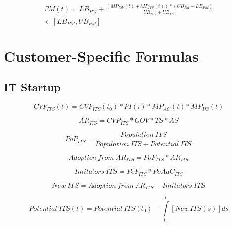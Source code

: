 \begin{eqnarray}
	PM(t) = LB_{PM} + \frac{(MP_{ISV}(t) + MP_{ITS}(t)) * (UB_{PM} - LB_{PM})}{UB_{ISV} + UB_{ITS}} \nonumber \\ \in [LB_{PM},UB_{PM}]
\end{eqnarray}

\section{Customer-Specific Formulas}\label{ch:app04:csf}


\subsection{IT Startup}\label{ch:app04:csf:its}

\begin{equation}
		CVP_{ITS}(t) =  CVP_{ITS}(t_0) * PI(t) * MP_{AC}(t) * MP_{PC}(t)
\end{equation}

\begin{equation}
		AR_{ITS} = CVP_{ITS} * GOV * TS * AS		
\end{equation}

\begin{equation}
	PoP_{ITS} = \frac{\mathit{Population~ITS}}{\mathit{Population~ITS}+\mathit{Potential~ITS}}
\end{equation}

\begin{equation}
	\mathit{Adoption~from~AR_{ITS}} = PoP_{ITS} * AR_{ITS}
\end{equation}

\begin{equation}
	\mathit{Imitators~ITS} = PoP_{ITS} * PoAaC_{ITS}
\end{equation}

\begin{equation}
	\mathit{New~ITS} = \mathit{Adoption~from~AR_{ITS}} + \mathit{Imitators~ITS}
\end{equation}

\begin{equation}
	\mathit{Potential~ITS(t)} =\mathit{Potential~ITS(t_0)} - \int\limits_{t_0}^t  [\mathit{New~ITS}(s)]ds
\end{equation}

